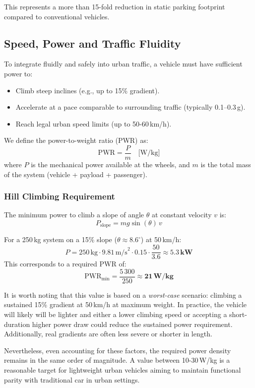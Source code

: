 This represents a more than 15-fold reduction in static parking footprint compared to conventional vehicles.\\

\subsection{Speed, Power and Traffic Fluidity}

To integrate fluidly and safely into urban traffic, a vehicle must have sufficient power to:
\begin{itemize}
    \item Climb steep inclines (e.g., up to 15\% gradient).
    \item Accelerate at a pace comparable to surrounding traffic (typically 0.1--0.3\,g).
    \item Reach legal urban speed limits (up to 50-60\,km/h).
\end{itemize}

\noindent
We define the power-to-weight ratio (PWR) as:
\[
    \text{PWR} = \frac{P}{m} \quad \text{[W/kg]}
\]
where $P$ is the mechanical power available at the wheels, and $m$ is the total mass of the system (vehicle + payload + passenger).

\subsubsection*{Hill Climbing Requirement}

The minimum power to climb a slope of angle $\theta$ at constant velocity $v$ is:
\[
    P_{\text{slope}} = m g \sin(\theta)\,v
\]

\noindent
For a 250\,kg system on a 15\% slope ($\theta \approx 8.6^\circ$) at 50\,km/h:
\[
    P = 250\,\text{kg} \cdot 9.81\,\text{m/s}^2 \cdot 0.15 \cdot \frac{50}{3.6} \approx \mathbf{5.3\,kW}
\]
This corresponds to a required PWR of:
\[
    \text{PWR}_{\text{min}} = \frac{5\,300}{250} \approx \mathbf{21\,W/kg}
\]

It is worth noting that this value is based on a \emph{worst-case} scenario: climbing a sustained 15\% gradient at 50\,km/h at maximum weight. In practice, the vehicle will likely will be lighter and either a lower climbing speed or accepting a short-duration higher power draw could reduce the sustained power requirement. Additionally, real gradients are often less severe or shorter in length.

Nevertheless, even accounting for these factors, the required power density remains in the same order of magnitude. A value between 10-30\,W/kg is a reasonable target for lightweight urban vehicles aiming to maintain functional parity with traditional car in urban settings.

